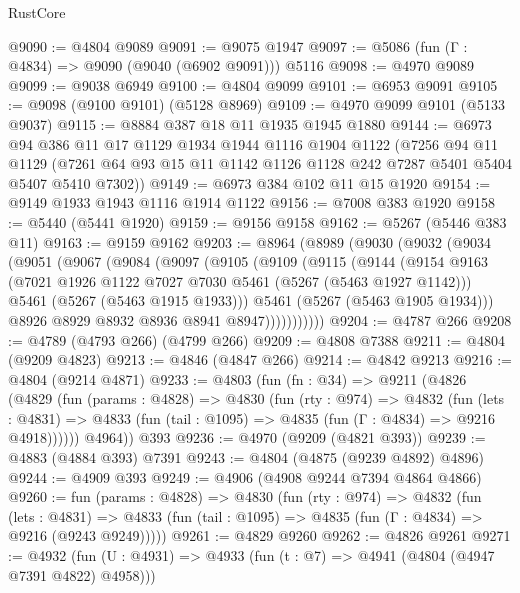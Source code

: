 \begin{lexlean}{RustCore}
\begin{coremodule}
@9090 := @4804 @9089
@9091 := @9075 @1947
@9097 := @5086 (fun (Γ : @4834) => @9090 (@9040 (@6902 @9091))) @5116
@9098 := @4970 @9089
@9099 := @9038 @6949
@9100 := @4804 @9099
@9101 := @6953 @9091
@9105 := @9098 (@9100 @9101) (@5128 @8969)
@9109 := @4970 @9099 @9101 (@5133 @9037)
@9115 := @8884 @387 @18 @11 @1935 @1945 @1880
@9144 := @6973
    @94
    @386
    @11
    @17
    @1129
    @1934
    @1944
    @1116
    @1904
    @1122
    (@7256
      @94
      @11
      @1129
      (@7261 @64 @93 @15 @11 @1142 @1126 @1128 @242 @7287 @5401 @5404 @5407 @5410 @7302))
@9149 := @6973 @384 @102 @11 @15 @1920
@9154 := @9149 @1933 @1943 @1116 @1914 @1122
@9156 := @7008 @383 @1920
@9158 := @5440 (@5441 @1920)
@9159 := @9156 @9158
@9162 := @5267 (@5446 @383 @11)
@9163 := @9159 @9162
@9203 := @8964
    (@8989
      (@9030
        (@9032
          (@9034
            (@9051
              (@9067
                (@9084
                  (@9097
                    (@9105
                      (@9109
                        (@9115
                          (@9144
                            (@9154
                              @9163
                              (@7021 @1926 @1122 @7027 @7030 @5461 (@5267 (@5463 @1927 @1142)))
                              @5461
                              (@5267 (@5463 @1915 @1933)))
                            @5461
                            (@5267 (@5463 @1905 @1934)))
                          @8926
                          @8929
                          @8932
                          @8936
                          @8941
                          @8947)))))))))))
@9204 := @4787 @266
@9208 := @4789 (@4793 @266) (@4799 @266)
@9209 := @4808 @7388
@9211 := @4804 (@9209 @4823)
@9213 := @4846 (@4847 @266)
@9214 := @4842 @9213
@9216 := @4804 (@9214 @4871)
@9233 := @4803
    (fun (fn : @34) =>
    @9211
      (@4826
        (@4829
          (fun (params : @4828) =>
          @4830
            (fun (rty : @974) =>
            @4832
              (fun (lets : @4831) =>
              @4833 (fun (tail : @1095) => @4835 (fun (Γ : @4834) => @9216 @4918))))))
        @4964))
    @393
@9236 := @4970 (@9209 (@4821 @393))
@9239 := @4883 (@4884 @393) @7391
@9243 := @4804 (@4875 (@9239 @4892) @4896)
@9244 := @4909 @393
@9249 := @4906 (@4908 @9244 @7394 @4864 @4866)
@9260 := fun (params : @4828) =>
  @4830
    (fun (rty : @974) =>
    @4832
      (fun (lets : @4831) =>
      @4833 (fun (tail : @1095) => @4835 (fun (Γ : @4834) => @9216 (@9243 @9249)))))
@9261 := @4829 @9260
@9262 := @4826 @9261
@9271 := @4932 (fun (U : @4931) => @4933 (fun (t : @7) => @4941 (@4804 (@4947 @7391 @4822) @4958)))

\end{coremodule}
\end{lexlean}

